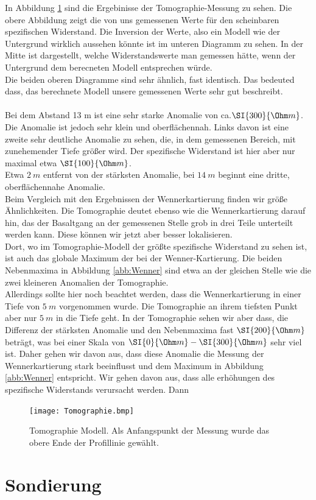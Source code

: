In Abbildung \ref{abb:Tomographie} sind die Ergebinisse der Tomographie-Messung zu sehen. Die obere Abbildung zeigt die von uns gemessenen Werte für den scheinbaren spezifischen Widerstand. Die Inversion der Werte, also ein Modell wie der Untergrund 
wirklich aussehen könnte ist im unteren Diagramm zu sehen. In der Mitte ist dargestellt, welche Widerstandswerte man gemessen hätte, wenn der Untergrund dem berecneten Modell entsprechen würde.\\
Die beiden oberen Diagramme sind sehr ähnlich, fast identisch. Das bedeuted dass, das berechnete Modell unsere gemessenen Werte sehr gut beschreibt. \\
\\
Bei dem Abstand 13 m ist eine sehr starke Anomalie von ca.$ \SI{ 300}{ \Ohm m}$. Die Anomalie ist jedoch sehr klein und oberflächennah. Links davon ist eine zweite sehr deutliche Anomalie zu sehen, die, in dem gemessenen Bereich,
mit zunehemender Tiefe größer wird. Der spezifische Widerstand ist hier aber nur maximal etwa $\SI{100}{\Ohm m}$. \\
Etwa $\SI{2}{m}$ entfernt von der stärksten Anomalie, bei  $\SI{14}{m}$ beginnt eine dritte, oberflächennahe Anomalie. \\
Beim Vergleich mit den Ergebnissen der Wennerkartierung finden wir größe Ähnlichkeiten. Die Tomographie deutet ebenso wie die Wennerkartierung darauf hin, das der Basaltgang an der gemessenen Stelle grob in drei Teile unterteilt werden kann. 
Diese können wir jetzt aber besser lokalisieren.\\
Dort, wo im Tomographie-Modell der größte spezifische Widerstand zu sehen ist, ist auch das globale Maximum der bei der Wenner-Kartierung. Die beiden Nebenmaxima in Abbildung \ref{abb:Wenner}
sind etwa an der gleichen Stelle wie die zwei kleineren Anomalien der Tomographie. \\ 
Allerdings sollte hier noch beachtet werden, dass die Wennerkartierung in einer Tiefe von $\SI{5}{m}$ vorgenommen wurde. Die Tomographie an ihrem tiefsten Punkt aber nur $\SI{5}{m}$ in die Tiefe geht.
In der Tomographie sehen wir aber dass, die Differenz der stärksten Anomalie und den Nebenmaxima fast $\SI{200}{\Ohm m}$ beträgt, was bei einer Skala von $\SI{0}{\Ohm m}- \SI{300}{\Ohm m}$ sehr viel ist. 
Daher gehen wir davon aus, dass diese Anomalie die Messung der Wennerkartierung stark beeinflusst und dem Maximum in Abbildung \ref{abb:Wenner} entspricht. 
Wir gehen davon aus, dass alle erhöhungen des spezifische Widerstands verursacht werden. Dann


\begin{figure}[h]
\centering
\texttt{[image: Tomographie.bmp]}
\caption{Tomographie Modell. Als Anfangspunkt der Messung wurde das obere Ende der Profillinie gewählt.}
\label{abb:Tomographie}
\end{figure}




\section{Sondierung}
